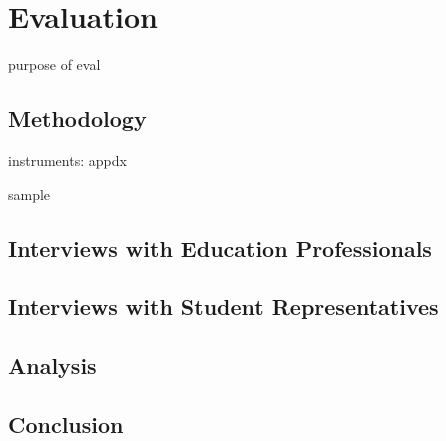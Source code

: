 \chapter{Evaluation}

purpose of eval

\section{Methodology}

instruments: appdx

sample

\section{Interviews with Education Professionals}

\section{Interviews with Student Representatives}

\section{Analysis}

\section{Conclusion}